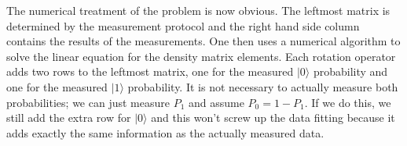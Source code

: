 \documentclass[twocolumn,english,aps,prl]{revtex4}
\newcommand{\ket}[1]{|#1\rangle}
\begin{document}
The numerical treatment of the problem is now obvious. The leftmost matrix is determined by the measurement protocol and the right hand side column contains the results of the measurements. One then uses a numerical algorithm to solve the linear equation for the density matrix elements. Each rotation operator adds two rows to the leftmost matrix, one for the measured $\ket{0}$ probability and one for the measured $\ket{1}$ probability. It is not necessary to actually measure both probabilities; we can just measure $P_1$ and assume $P_0 = 1-P_1$. If we do this, we still add the extra row for $\ket{0}$ and this won't screw up the data fitting because it adds exactly the same information as the actually measured data.
\end{document}
